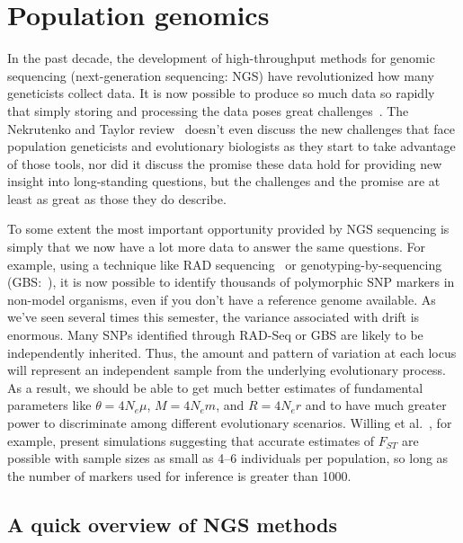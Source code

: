 \chapter{Population genomics}

In the past decade, the development of high-throughput methods for
genomic sequencing (next-generation sequencing: NGS) have
revolutionized how many geneticists collect data. It is now possible
to produce so much data so rapidly that simply storing and processing
the data poses great challenges~\cite{Nekrutenko-Taylor-2012}. The
Nekrutenko and Taylor review~\cite{Nekrutenko-Taylor-2012} doesn't
even discuss the new challenges that face population geneticists and
evolutionary biologists as they start to take advantage of those
tools, nor did it discuss the promise these data hold for providing
new insight into long-standing questions, but the challenges and the
promise are at least as great as those they do
describe.

To some extent the most important opportunity provided by NGS
sequencing is simply that we now have a lot more data to answer the
same questions. For example, using a technique like RAD
sequencing~\cite{Baird-etal-2008} or genotyping-by-sequencing
(GBS:~\cite{Elshire-etal-2011}), it is now possible to identify
thousands of polymorphic SNP markers in non-model organisms, even if
you don't have a reference genome available. As we've seen several
times this semester, the variance associated with drift is
enormous. Many SNPs identified through RAD-Seq or GBS are likely to be
independently inherited. Thus, the amount and pattern of variation at
each locus will represent an independent sample from the underlying
evolutionary process. As a result, we should be able to get much
better estimates of fundamental parameters like $\theta=4N_e\mu$,
$M=4N_em$, and $R=4N_er$ and to have much greater power to
discriminate among different evolutionary scenarios. Willing et
al.~\cite{Willing-etal-2012}, for example, present simulations
suggesting that accurate estimates of $F_{ST}$ are possible with
sample sizes as small as 4--6 individuals per population, so long as
the number of markers used for inference is greater than
1000.

\section*{A quick overview of NGS methods}

